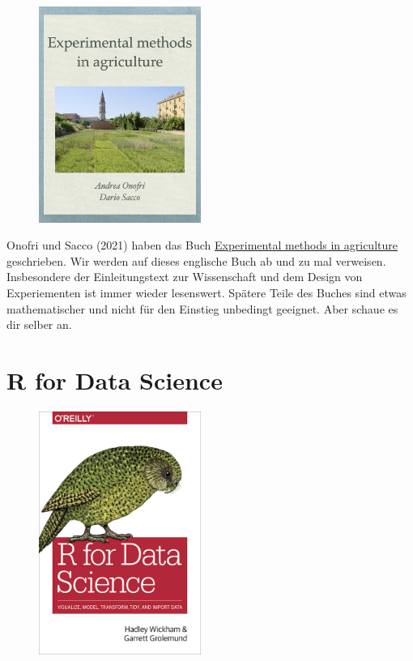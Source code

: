 \documentclass[
  letterpaper,
]{scrbook}
\begin{document}
\begin{figure}

{\centering \includegraphics[width=2.08333in,height=\textheight]{./images/cover_stat_for_biology.jpeg}

}

\end{figure}

Onofri und Sacco (2021) haben das Buch
\href{https://www.statforbiology.com/_statbookeng/}{Experimental methods
in agriculture} geschrieben. Wir werden auf dieses englische Buch ab und
zu mal verweisen. Insbesondere der Einleitungstext zur Wissenschaft und
dem Design von Experiementen ist immer wieder lesenswert. Spätere Teile
des Buches sind etwas mathematischer und nicht für den Einstieg
unbedingt geeignet. Aber schaue es dir selber an.

\hypertarget{r-for-data-science}{%
\section{R for Data Science}\label{r-for-data-science}}

\begin{figure}

{\centering \includegraphics[width=2.08333in,height=\textheight]{./images/hadley.png}

}

\end{figure}
\end{document}
